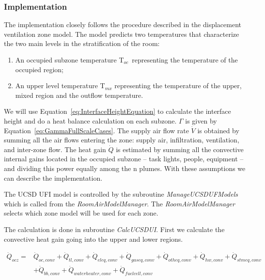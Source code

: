 {\subsubsection{Implementation}\label{implementation-1}

The implementation closely follows the procedure described in the displacement ventilation zone model. The model predicts two temperatures that characterize the two main levels in the stratification of the room:

\begin{enumerate}
\item An occupied subzone temperature T\(_{oc}\)~representing the temperature of the occupied region;
\item An upper level temperature T\(_{mx}\) representing the temperature of the upper, mixed region and the outflow temperature.
\end{enumerate}

We will use Equation~\ref{eq:InterfaceHeightEquation} to calculate the interface height and do a heat balance calculation on each subzone. \emph{\(\Gamma\)} is given by Equation~\ref{eq:GammaFullScaleCases}. The supply air flow rate \(\dot V\) is obtained by summing all the air flows entering the zone: supply air, infiltration, ventilation, and inter-zone flow. The heat gain \(\dot Q\) is estimated by summing all the convective internal gains located in the occupied subzone -- task lights, people, equipment -- and dividing this power equally among the n plumes. With these assumptions we can describe the implementation.

The UCSD UFI model is controlled by the subroutine \emph{ManageUCSDUFModels} which is called from the \emph{RoomAirModelManager}. The \emph{RoomAirModelManager} selects which zone model will be used for each zone.

The calculation is done in subroutine \emph{CalcUCSDUI}. First we calculate the convective heat gain going into the upper and lower regions.

\begin{equation}
\begin{split}
\dot Q_{ocz} =& \dot Q_{oc,conv} + \dot Q_{tl,conv} + \dot Q_{eleq,conv} + \dot Q_{gaseq,conv} + \dot Q_{otheq,conv} + \dot Q_{hw,conv} + \dot Q_{stmeq,conv} \\
&+ \dot Q_{bb,conv} + \dot Q_{waterheater,conv} + \dot Q_{fuelcell,conv}
\end{split}
\end{equation}

}
